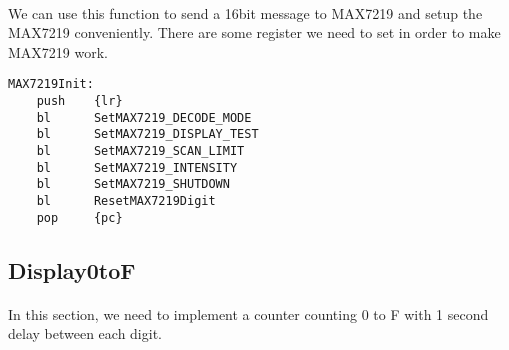 \paragraph{}
We can use this function to send a 16bit message to MAX7219 and setup the MAX7219 conveniently. There are some register we need to set in order to make MAX7219 work.
\begin{lstlisting}
MAX7219Init:
    push    {lr}
    bl      SetMAX7219_DECODE_MODE
    bl      SetMAX7219_DISPLAY_TEST
    bl      SetMAX7219_SCAN_LIMIT
    bl      SetMAX7219_INTENSITY
    bl      SetMAX7219_SHUTDOWN
    bl      ResetMAX7219Digit
    pop     {pc}
\end{lstlisting}
\subsection{Display0toF}
\paragraph{}
In this section, we need to implement a counter counting 0 to F with 1 second delay between each digit. 
